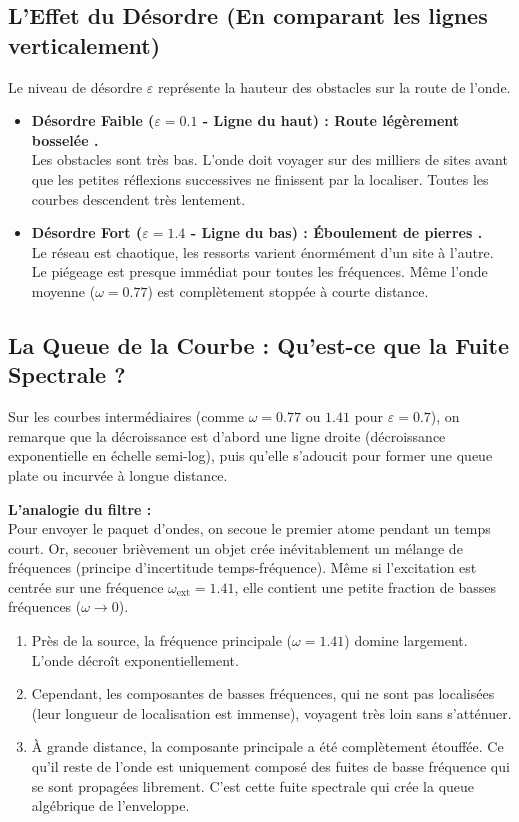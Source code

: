 \documentclass[11pt,a4paper]{article}
\begin{document}
\subsection{L'Effet du Désordre (En comparant les lignes verticalement)}
Le niveau de désordre $\varepsilon$ représente la hauteur des obstacles sur la route de l'onde.
\begin{itemize}
    \item \textbf{Désordre Faible ($\varepsilon = 0.1$ - Ligne du haut) : \og  Route légèrement bosselée \fg{}.} \\
    Les obstacles sont très bas. L'onde doit voyager sur des milliers de sites avant que les petites réflexions successives ne finissent par la localiser. Toutes les courbes descendent très lentement.
    
    \item \textbf{Désordre Fort ($\varepsilon = 1.4$ - Ligne du bas) : \og  Éboulement de pierres \fg{}.} \\
    Le réseau est chaotique, les ressorts varient énormément d'un site à l'autre. Le piégeage est presque immédiat pour toutes les fréquences. Même l'onde moyenne ($\omega = 0.77$) est complètement stoppée à courte distance.
\end{itemize}

\subsection{La Queue de la Courbe : Qu'est-ce que la \og  Fuite Spectrale \fg{} ?}
Sur les courbes intermédiaires (comme $\omega = 0.77$ ou $1.41$ pour $\varepsilon = 0.7$), on remarque que la décroissance est d'abord une ligne droite (décroissance exponentielle en échelle semi-log), puis qu'elle s'adoucit pour former une \og  queue \fg{} plate ou incurvée à longue distance. 

\textbf{L'analogie du filtre :} \\
Pour envoyer le paquet d'ondes, on secoue le premier atome pendant un temps court. Or, secouer brièvement un objet crée inévitablement un mélange de fréquences (principe d'incertitude temps-fréquence). Même si l'excitation est centrée sur une fréquence $\omega_{\text{ext}} = 1.41$, elle contient une petite fraction de basses fréquences ($\omega \to 0$).
\begin{enumerate}
    \item Près de la source, la fréquence principale ($\omega = 1.41$) domine largement. L'onde décroît exponentiellement.
    \item Cependant, les composantes de basses fréquences, qui ne sont pas localisées (leur longueur de localisation est immense), voyagent très loin sans s'atténuer.
    \item À grande distance, la composante principale a été complètement étouffée. Ce qu'il reste de l'onde est uniquement composé des \og  fuites \fg{} de basse fréquence qui se sont propagées librement. C'est cette fuite spectrale qui crée la queue algébrique de l'enveloppe.
\end{enumerate}
\end{document}
